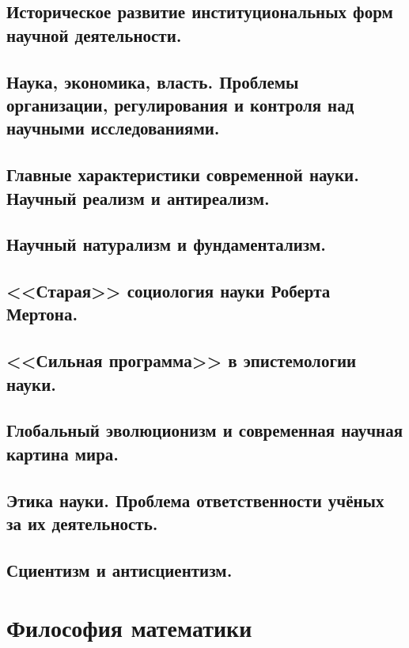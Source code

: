\documentclass[12pt, specialist, subf, substylefile = spbu.rtx]{disser}
\begin{document}
\section{Историческое развитие институциональных форм научной деятельности.}

\section{Наука, экономика, власть. Проблемы организации, регулирования и контроля над научными исследованиями.}

\section{Главные характеристики современной  науки. Научный реализм и антиреализм.}

\section{Научный натурализм и фундаментализм.}

\section{<<Старая>> социология науки Роберта Мертона.}

\section{<<Сильная программа>> в эпистемологии науки.}

\section{Глобальный эволюционизм и современная научная картина мира.}

\section{Этика науки. Проблема ответственности учёных за их деятельность.}

\section{Сциентизм и антисциентизм.}




\chapter{Философия математики}
\end{document}
